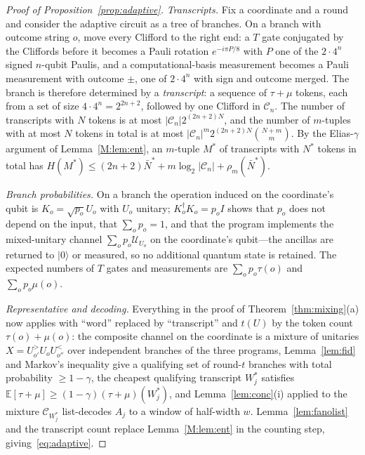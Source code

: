 \documentclass[aps,prx,twocolumn,superscriptaddress,nofootinbib,longbibliography]{revtex4-2}
\theoremstyle{plain}
\theoremstyle{definition}
\theoremstyle{remark}
\newcommand{\E}{\mathbb{E}}
\begin{document}
\begin{proof}[Proof of Proposition~\ref{prop:adaptive}]
\emph{Transcripts.} Fix a coordinate and a round and consider the adaptive circuit as a tree of branches. On a branch with outcome string $o$, move every Clifford to the right end: a $T$ gate conjugated by the Cliffords before it becomes a Pauli rotation $e^{-i\pi P/8}$ with $P$ one of the $2\cdot4^n$ signed $n$-qubit Paulis, and a computational-basis measurement becomes a Pauli measurement with outcome $\pm$, one of $2\cdot4^n$ with sign and outcome merged. The branch is therefore determined by a \emph{transcript}: a sequence of $\tau+\mu$ tokens, each from a set of size $4\cdot4^n=2^{2n+2}$, followed by one Clifford in $\mathcal C_n$. The number of transcripts with $N$ tokens is at most $|\mathcal C_n|2^{(2n+2)N}$, and the number of $m$-tuples with at most $N$ tokens in total is at most $|\mathcal C_n|^m2^{(2n+2)N}\binom{N+m}m$. By the Elias-$\gamma$ argument of Lemma~\ref{M:lem:ent}, an $m$-tuple $M^*$ of transcripts with $N^*$ tokens in total has $H(M^*)\le(2n+2)\bar N^*+m\log_2|\mathcal C_n|+\rho_m(\bar N^*)$.

\emph{Branch probabilities.} On a branch the operation induced on the coordinate's qubit is $K_o=\sqrt{p_o}U_o$ with $U_o$ unitary; $K_o^\dagger K_o=p_oI$ shows that $p_o$ does not depend on the input, that $\sum_op_o=1$, and that the program implements the mixed-unitary channel $\sum_op_o\mathcal U_{U_o}$ on the coordinate's qubit---the ancillas are returned to $|0\rangle$ or measured, so no additional quantum state is retained. The expected numbers of $T$ gates and measurements are $\sum_op_o\tau(o)$ and $\sum_op_o\mu(o)$.

\emph{Representative and decoding.} Everything in the proof of Theorem~\ref{thm:mixing}(a) now applies with ``word'' replaced by ``transcript'' and $t(U)$ by the token count $\tau(o)+\mu(o)$: the composite channel on the coordinate is a mixture of unitaries $X=U^>_{o'}U_oU^<_{o''}$ over independent branches of the three programs, Lemma~\ref{lem:fid} and Markov's inequality give a qualifying set of round-$t$ branches with total probability $\ge1-\gamma$, the cheapest qualifying transcript $W^*_j$ satisfies $\E[\tau+\mu]\ge(1-\gamma)(\tau+\mu)(W^*_j)$, and Lemma~\ref{lem:conc}(i) applied to the mixture $\mathcal C_{W^*_j}$ list-decodes $A_j$ to a window of half-width $w$. Lemma~\ref{lem:fanolist} and the transcript count replace Lemma~\ref{M:lem:ent} in the counting step, giving~\eqref{eq:adaptive}.
\end{proof}
\end{document}

